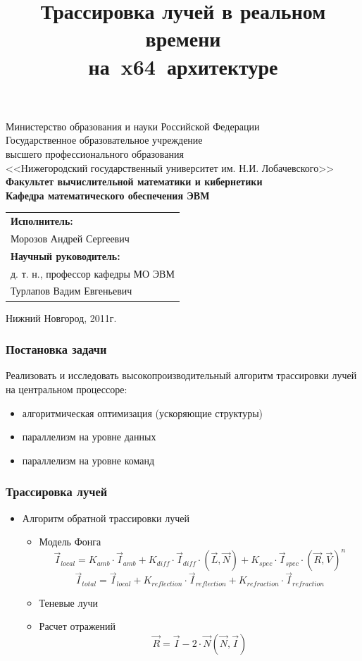 \documentclass[utf8, 12pt]{beamer}
\title{Трассировка лучей в реальном времени \\ на~x64~архитектуре}
\author{}\date{}
\begin{document}
\begin{frame}
\begin{center}
{\tiny
Министерство образования и науки Российской Федерации\\ 
Государственное образовательное учреждение \\ 
высшего профессионального образования \\ 
<<Нижегородский государственный университет им. Н.И. Лобачевского>>\\
\bf{Факультет вычислительной математики и кибернетики \\
Кафедра математического обеспечения ЭВМ} \\
}
\end{center}
\titlepage
\vspace*{-1.75cm}
{\small
\begin{flushright}
\begin{tabular}{l}
\bf{Исполнитель}: \\ 
Морозов Андрей Сергеевич \\
\bf{Научный руководитель}: \\
д. т. н., профессор кафедры МО ЭВМ \\
Турлапов Вадим Евгеньевич
\end{tabular}
\end{flushright}
}
\vspace*{1.2cm}
\begin{center}
\small Нижний Новгород, 2011г.
\end{center}
\end{frame}

\begin{frame}
\frametitle{Постановка задачи}
Реализовать и исследовать высокопроизводительный алгоритм трассировки лучей на центральном процессоре:
\begin{itemize}
\item алгоритмическая оптимизация (ускоряющие структуры)
\item параллелизм на уровне данных
\item параллелизм на уровне команд
\end{itemize}
\end{frame}

\begin{frame}
\frametitle{Трассировка лучей}
\begin{itemize}
\item Алгоритм обратной трассировки лучей
\begin{itemize}
\item Модель Фонга
$$
 \vec{I}_{local} =  K_{amb} \cdot \vec{I}_{amb} +  K_{diff} \cdot \vec{I}_{diff} \cdot \left( \vec{L},\vec{N} \right) + K_{spec} \cdot \vec{I}_{spec} \cdot \left( \vec{R},\vec{V} \right)^n
$$
$$
 \vec{I}_{total} = \vec{I}_{local} + K_{reflection} \cdot \vec{I}_{reflection} + K_{refraction} \cdot \vec{I}_{refraction}
$$
\item Теневые лучи
\item Расчет отражений
$$
\vec{R} = \vec{I} - 2 \cdot \vec{N} (\vec{N} , \vec{I})
$$
\end{itemize}
\end{itemize}
\end{frame}
\end{document}
